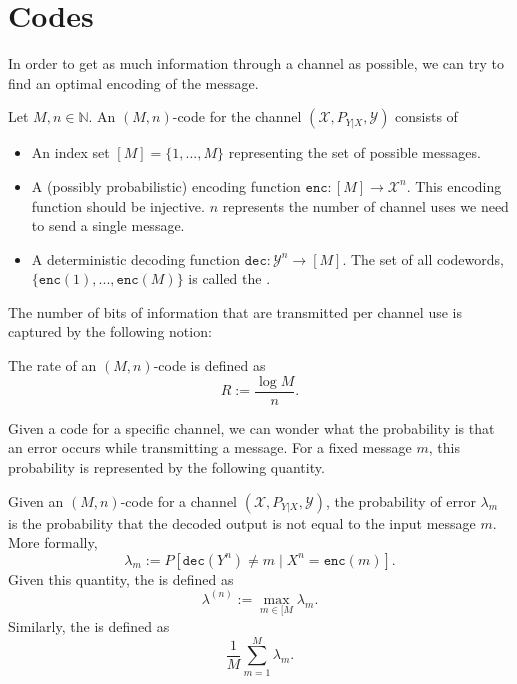\section{Codes}
In order to get as much information through a channel as possible, we can try to find an optimal encoding of the message.

\begin{definition}[Code]
Let $M, n \in \mathbb{N}$. An $(M,n)$-code for the channel $(\mathcal{X},P_{Y|X},\mathcal{Y})$ consists of
\begin{itemize}
\item An index set $[M] = \{1, ..., M\}$ representing the set of possible messages.
\item A (possibly probabilistic) encoding function $\mathtt{enc} :[M] \to \mathcal{X}^n$. This encoding function should be injective. $n$ represents the number of channel uses we need to send a single message.
\item A deterministic decoding function $\mathtt{dec} : \mathcal{Y}^n \to [M]$.
The set of all codewords, $\{\mathtt{enc}(1), ..., \mathtt{enc}(M)\}$ is called the .
\end{itemize}
\end{definition}

\noindent The number of bits of information that are transmitted per channel use is captured by the following notion:

\begin{definition}[Rate]
The rate of an $(M,n)$-code is defined as
\[
R := \frac{\log M}{n}.
\]
\end{definition}

Given a code for a specific channel, we can wonder what the probability is that an error occurs while transmitting a message. For a fixed message $m$, this probability is represented by the following quantity.

\begin{definition}
Given an $(M,n)$-code for a channel $(\mathcal{X},P_{Y|X},\mathcal{Y})$, the probability of error $\lambda_m$ is the probability that the decoded output is not equal to the input message $m$. More formally,
\[
\lambda_m := P[\mathtt{dec}(Y^n) \neq m \mid X^n = \mathtt{enc}(m)].
\]
Given this quantity, the  is defined as 
\[\lambda^{(n)} := \max_{m \in [M} \lambda_m.\]
Similarly, the  is defined as
\[
\frac{1}{M} \sum_{m=1}^M \lambda_m.
\]
\end{definition}


